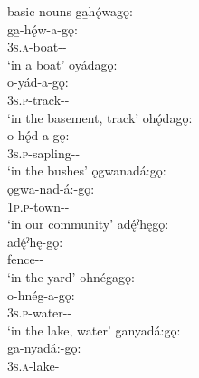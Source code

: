 \ea\label{ex:gonex} basic nouns
\ea ga̱hǫ́wagǫ:\\
\gll ga̱-hǫ́w-a-gǫ:\\
 \textsc{3s.a}-boat-{\joinerA}-\\
\glt `in a boat'
\ex oyádagǫ:\\
\gll o-yád-a-gǫ:\\
 \textsc{3s.p}-track-{\joinerA}-\\
\glt `in the basement, track'
\ex ohǫ́dagǫ:\\
\gll o-hǫ́d-a-gǫ:\\
 \textsc{3s.p}-sapling-{\joinerA}-\\
\glt `in the bushes'
\ex ǫgwanadá:gǫ:\\
\gll ǫgwa-nad-á:-gǫ:\\
 \textsc{1p.p}-town-{\joinerA}-\\
\glt `in our community'
\ex adę́ˀhęgǫ:\\
\gll adę́ˀhę-gǫ:\\
 fence-{\joinerA}-\\
\glt `in the yard'
\ex ohnégagǫ:\\
\gll o-hnég-a-gǫ:\\
 \textsc{3s.p}-water-{\joinerA}-\\
\glt `in the lake, water'
\ex ganyadá:gǫ:\\
\gll ga-nyadá:-gǫ:\\
 \textsc{3s.a}-lake-\\
